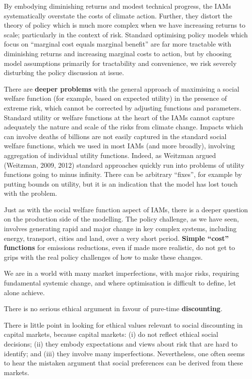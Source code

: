 \documentclass[
]{book}
\begin{document}
By embodying diminishing returns and modest technical progress,
the IAMs systematically overstate the costs of climate action. Further, they distort the theory of policy
which is much more complex when we have increasing returns to scale; particularly in the context of
risk. Standard optimising policy models which focus on ``marginal cost equals marginal benefit'' are far
more tractable with diminishing returns and increasing marginal costs to action, but by choosing model
assumptions primarily for tractability and convenience, we risk severely disturbing the policy discussion
at issue.

There are \textbf{deeper problems} with the general approach of
maximising a social welfare function (for example, based on expected utility) in the presence of extreme
risk, which cannot be corrected by adjusting functions and parameters.
Standard utility or welfare functions at the heart of the IAMs cannot capture
adequately the nature and scale of the risks from climate change.
Impacts which can involve deaths of billions are not easily captured in the standard social welfare
functions, which we used in most IAMs (and more broadly), involving aggregation of individual utility
functions. Indeed, as Weitzman argued (Weitzman, 2009, 2012) standard approaches quickly run into
problems of utility functions going to minus infinity. There can be arbitrary ``fixes'', for example by putting
bounds on utility, but it is an indication that the model has lost touch with the problem.

Just as with the social welfare function aspect of IAMs, there is a deeper question on the production
side of the modelling. The policy challenge, as we have seen, involves generating rapid and major
change in key complex systems, including energy, transport, cities and land, over a very short period.
\textbf{Simple ``cost'' functions} for emissions reductions, even if made more realistic, do not get to grips with the real policy challenges of how to make these changes.

We are in a world with many market imperfections, with major risks, requiring
fundamental systemic change, and where optimisation is difficult to define, let alone achieve.

There is no serious ethical argument in favour of pure-time \textbf{discounting}.

There is little point in looking for ethical values relevant to
social discounting in capital markets, because capital markets: (i) do not reflect ethical social decisions;
(ii) they embody expectations and views about risk that are hard to identify; and (iii) they involve many
imperfections. Nevertheless, one often seems to hear the mistaken argument that social preferences
can be derived from these markets.
\end{document}
